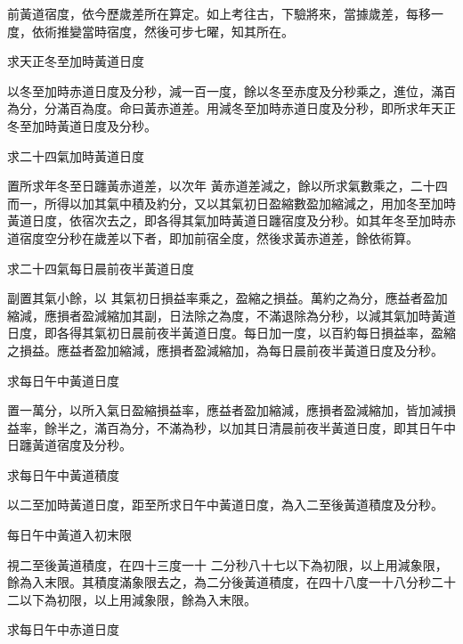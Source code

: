 \begin{pinyinscope}
 前黃道宿度，依今歷歲差所在算定。如上考往古，下驗將來，當據歲差，每移一度，依術推變當時宿度，然後可步七曜，知其所在。



 求天正冬至加時黃道日度



 以冬至加時赤道日度及分秒，減一百一度，餘以冬至赤度及分秒乘之，進位，滿百為分，分滿百為度。命曰黃赤道差。用減冬至加時赤道日度及分秒，即所求年天正冬至加時黃道日度及分秒。



 求二十四氣加時黃道日度



 置所求年冬至日躔黃赤道差，以次年
 黃赤道差減之，餘以所求氣數乘之，二十四而一，所得以加其氣中積及約分，又以其氣初日盈縮數盈加縮減之，用加冬至加時黃道日度，依宿次去之，即各得其氣加時黃道日躔宿度及分秒。如其年冬至加時赤道宿度空分秒在歲差以下者，即加前宿全度，然後求黃赤道差，餘依術算。



 求二十四氣每日晨前夜半黃道日度



 副置其氣小餘，以
 其氣初日損益率乘之，盈縮之損益。萬約之為分，應益者盈加縮減，應損者盈減縮加其副，日法除之為度，不滿退除為分秒，以減其氣加時黃道日度，即各得其氣初日晨前夜半黃道日度。每日加一度，以百約每日損益率，盈縮之損益。應益者盈加縮減，應損者盈減縮加，為每日晨前夜半黃道日度及分秒。



 求每日午中黃道日度



 置一萬分，以所入氣日盈縮損益率，應益者盈加縮減，應損者盈減縮加，皆加減損益率，餘半之，滿百為分，不滿為秒，以加其日清晨前夜半黃道日度，即其日午中日躔黃道宿度及分秒。



 求每日午中黃道積度



 以二至加時黃道日度，距至所求日午中黃道日度，為入二至後黃道積度及分秒。



 每日午中黃道入初末限



 視二至後黃道積度，在四十三度一十
 二分秒八十七以下為初限，以上用減象限，餘為入末限。其積度滿象限去之，為二分後黃道積度，在四十八度一十八分秒二十二以下為初限，以上用減象限，餘為入末限。



 求每日午中赤道日度




\end{pinyinscope}
